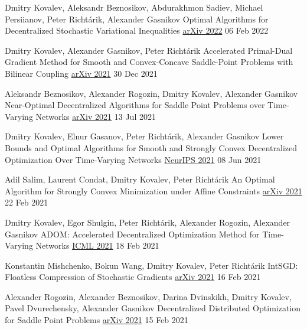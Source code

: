 
\begin{cventries}
	

\cventry
{Dmitry Kovalev, Aleksandr Beznosikov, Abdurakhmon Sadiev, Michael Persiianov, Peter Richtárik, Alexander Gasnikov} %
{Optimal Algorithms for Decentralized Stochastic Variational Inequalities} %
{\href{https://arxiv.org/abs/2202.02771}{arXiv 2022}} 
{06 Feb 2022} %
{}	

\cventry
{Dmitry Kovalev, Alexander Gasnikov, Peter Richtárik} %
{Accelerated Primal-Dual Gradient Method for Smooth and Convex-Concave Saddle-Point Problems with Bilinear Coupling} %
{\href{https://arxiv.org/abs/2112.15199}{arXiv 2021}} 
{30 Dec 2021} %
{}	

\cventry
{Aleksandr Beznosikov, Alexander Rogozin, Dmitry Kovalev, Alexander Gasnikov} %
{Near-Optimal Decentralized Algorithms for Saddle Point Problems over Time-Varying Networks} %
{\href{https://arxiv.org/abs/2107.05957}{arXiv 2021}} 
{13 Jul 2021} %
{}	

\cventry
{Dmitry Kovalev, Elnur Gasanov, Peter Richtárik, Alexander Gasnikov} %
{Lower Bounds and Optimal Algorithms for Smooth and Strongly Convex Decentralized Optimization Over Time-Varying Networks} %
{\href{https://proceedings.neurips.cc/paper/2021/hash/bc37e109d92bdc1ea71da6c919d54907-Abstract.html}{NeurIPS 2021}} 
{08 Jun 2021} %
{}	

\cventry
{Adil Salim, Laurent Condat, Dmitry Kovalev, Peter Richtárik} %
{An Optimal Algorithm for Strongly Convex Minimization under Affine Constraints} %
{\href{https://arxiv.org/abs/2102.11079}{arXiv 2021}} 
{22 Feb 2021} %
{}	

\cventry
{Dmitry Kovalev, Egor Shulgin, Peter Richtárik, Alexander Rogozin, Alexander Gasnikov} %
{ADOM: Accelerated Decentralized Optimization Method for Time-Varying Networks} %
{\href{http://proceedings.mlr.press/v139/kovalev21a}{ICML 2021}} 
{18 Feb 2021} %
{}	

\cventry
{Konstantin Mishchenko, Bokun Wang, Dmitry Kovalev, Peter Richtárik} %
{IntSGD: Floatless Compression of Stochastic Gradients} %
{\href{https://arxiv.org/abs/2102.08374}{arXiv 2021}} 
{16 Feb 2021} %
{}	

\cventry
{Alexander Rogozin, Alexander Beznosikov, Darina Dvinskikh, Dmitry Kovalev, Pavel Dvurechensky, Alexander Gasnikov} %
{Decentralized Distributed Optimization for Saddle Point Problems} %
{\href{https://arxiv.org/abs/2102.07758}{arXiv 2021}} 
{15 Feb 2021} %
{}	


\end{cventries}
